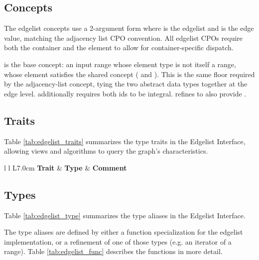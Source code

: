 \subsection{Concepts}
The edgelist concepts use a 2-argument form  where  is the edgelist and  is the edge value,
matching the adjacency list CPO convention. All edgelist CPOs require both the container and the element to allow for
container-specific dispatch.

 is the base concept: an input range whose element type is not itself a range, whose element
satisfies the shared  concept ( and ).
This is the same  floor required by the adjacency-list  concept, tying the two abstract data types
together at the edge level.  additionally
requires both ids to be integral.  refines  to also provide .
{\small
     
}
\subsection{Traits}
Table \ref{tab:edgelist_traits} summarizes the type traits in the Edgelist Interface, allowing views and algorithms to query the graph's characteristics.

\begin{table}[h!]
\begin{center}
{\begin{tabular}{l l L{7.0cm}}
\hline
    \textbf{Trait} & \textbf{Type} & \textbf{Comment} \\
\hline

\hline
\end{tabular}}
\caption{Graph Container Interface Type Traits}
\label{tab:edgelist_traits}
\end{center}
\end{table}

%     
\subsection{Types}
Table \ref{tab:edgelist_type} summarizes the type aliases in the Edgelist Interface.

The type aliases are defined by either a function specialization for the edgelist implementation, or a refinement of one of 
those types (e.g. an iterator of a range). Table \ref{tab:edgelist_func} describes the functions in more detail.

